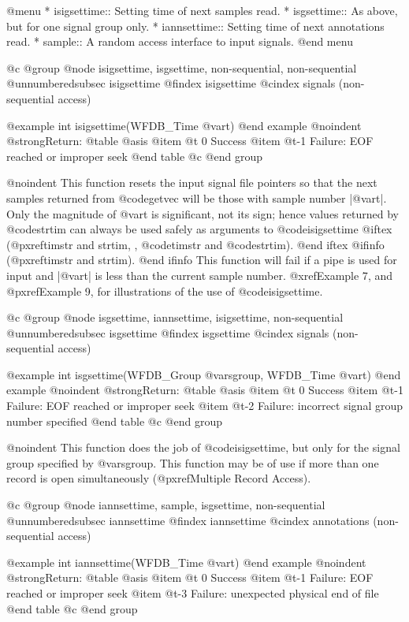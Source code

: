 {{{{{{{{{@menu
* isigsettime::			Setting time of next samples read.
* isgsettime::			As above, but for one signal group only.
* iannsettime::			Setting time of next annotations read.
* sample::			A random access interface to input signals.
@end menu

@c @group
@node     isigsettime, isgsettime, non-sequential, non-sequential
@unnumberedsubsec isigsettime
@findex isigsettime
@cindex signals (non-sequential access)

@example
int isigsettime(WFDB_Time @var{t})
@end example
@noindent
@strong{Return:}
@table @asis
@item @t{ 0}
Success
@item @t{-1}
Failure: EOF reached or improper seek
@end table
@c @end group

@noindent
This function resets the input signal file pointers so that the next
samples returned from @code{getvec} will be those with sample number
|@var{t}|.  Only the magnitude of @var{t} is significant, not its sign;
hence values returned by @code{strtim} can always be used safely as
arguments to @code{isigsettime}
@iftex
(@pxref{timstr and strtim, , @code{timstr} and @code{strtim}}).
@end iftex
@ifinfo
(@pxref{timstr and strtim}).
@end ifinfo
This function will fail if a pipe is used for input and |@var{t}| is less
than the current sample number.  @xref{Example 7}, and @pxref{Example 9},
for illustrations of the use of @code{isigsettime}.

@c @group
@node     isgsettime, iannsettime, isigsettime, non-sequential
@unnumberedsubsec isgsettime
@findex isgsettime
@cindex signals (non-sequential access)

@example
int isgsettime(WFDB_Group @var{sgroup}, WFDB_Time @var{t})
@end example
@noindent
@strong{Return:}
@table @asis
@item @t{ 0}
Success
@item @t{-1}
Failure: EOF reached or improper seek
@item @t{-2}
Failure: incorrect signal group number specified
@end table
@c @end group

@noindent
This function does the job of @code{isigsettime}, but only for the signal
group specified by @var{sgroup}.  This function may be of use if more than
one record is open simultaneously (@pxref{Multiple Record Access}).

@c @group
@node     iannsettime, sample, isgsettime, non-sequential
@unnumberedsubsec iannsettime
@findex iannsettime
@cindex annotations (non-sequential access)

@example
int iannsettime(WFDB_Time @var{t})
@end example
@noindent
@strong{Return:}
@table @asis
@item @t{ 0}
Success
@item @t{-1}
Failure: EOF reached or improper seek
@item @t{-3}
Failure: unexpected physical end of file
@end table
@c @end group

}}}}}}}}}
